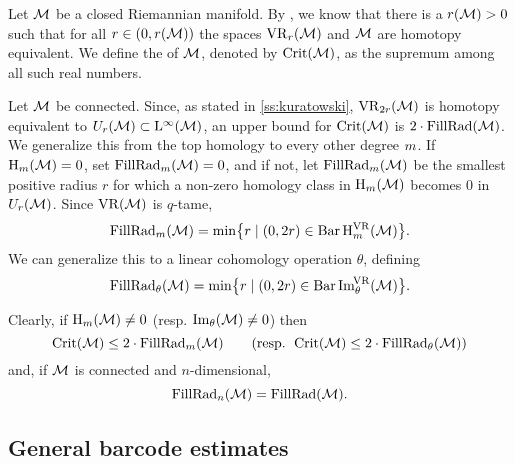 \subsubsection{}
\label{subsub:first_critical_value}
\label{subsub:beta v.s. fillrad}

Let \(\cM\) be a closed Riemannian manifold.
By \cite[Thm.3.5]{hausmann1995vietoris}, we know that there is a \(r(\cM) > 0\) such that for all \(r \in (0,r(\cM))\) the spaces \(\VR_r(\cM)\) and \(\cM\) are homotopy equivalent.
We define the  of \(\cM\), denoted by \(\crit(\cM)\), as the supremum among all such real numbers.


Let \(\cM\) be connected.
Since, as stated in \cref{ss:kuratowski}, \(\VR_{2r}(\cM)\) is homotopy equivalent to \(U_r(\cM) \subset \rL^\infty(\cM)\), an upper bound for \(\crit(\cM)\) is \(2\cdot\fillrad(\cM)\).
We generalize this from the top homology to every other degree \(\degp\).
If \(\rH_\degp(\cM) = 0\), set \(\fillrad_m(\cM) = 0\), and if not, let \(\fillrad_m(\cM)\) be the smallest positive radius $r$ for which a non-zero homology class in \(\rH_\degp(\cM)\) becomes \(0\) in \(U_r(\cM)\).
Since \(\VR(\cM)\) is \(q\)-tame,
\[
\fillrad_m(\cM) = \min\set[\big]{r \mid (0, 2r) \in \barc \rH^{\VR}_m(\cM)}.
\]
We can generalize this to a linear cohomology operation \(\theta\), defining
\[
\fillrad_\theta(\cM) = \min\set[\big]{r \mid (0, 2r) \in \barc \img_\theta^{\!\VR}(\cM)}.
\]


Clearly, if \(\rH_m(\cM) \neq 0\) (resp. \(\img_\theta(\cM) \neq 0\)) then
\[
\crit(\cM) \leq 2 \cdot \fillrad_m(\cM) \qquad (\text{resp. } \crit(\cM) \leq 2 \cdot \fillrad_\theta(\cM))
\]
and, if \(\cM\) is connected and \(n\)-dimensional,
\[
\fillrad_n(\cM) = \fillrad(\cM).
\]

\subsection{General barcode estimates}
\label{subsub:barcode_general}


